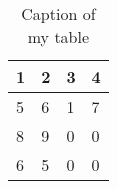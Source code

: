 \begin{table}[ht]
\centering
\begin{tabular}{|l|l|l|l|}
\hline
\multicolumn{1}{|c|}{1} & 2 & 3 & 4 \\ \hline
5                       & 6 & 1 & 7 \\ \hline
8                       & 9 & 0 & 0 \\ \hline
6                       & 5 & 0 & 0 \\ \hline
\end{tabular}
\label{tab:mytable}
\caption{Caption of my table}
\end{table}